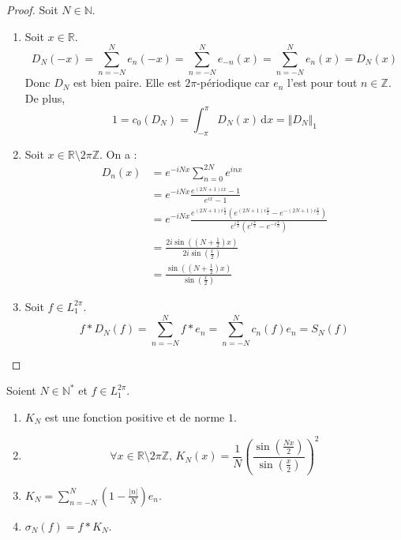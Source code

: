   \begin{proof}
    Soit $N \in \mathbb{N}$.
    \begin{enumerate}[label=(\roman*)]
      \item Soit $x \in \mathbb{R}$.
      \[ D_N(-x) = \sum_{n=-N}^{N} e_n(-x) = \sum_{n=-N}^{N} e_{-n}(x) = \sum_{n=-N}^{N} e_n(x) = D_N(x) \]
      Donc $D_N$ est bien paire. Elle est $2\pi$-périodique car $e_n$ l'est pour tout $n \in \mathbb{Z}$. De plus,
      \[ 1 = c_0(D_N) = \int_{-\pi}^{\pi} D_N(x) \, \mathrm{d}x = \Vert D_N \Vert_1 \]
      \item Soit $x \in \mathbb{R}\setminus 2\pi\mathbb{Z}$. On a :
      \begin{align*}
        D_n(x) &= e^{-iNx} \sum_{n=0}^{2N} e^{inx} \\
        &= e^{-iNx} \frac{e^{(2N+1)ix} - 1}{e^{ix} - 1} \\
        &= e^{-iNx} \frac{e^{(2N+1) i\frac{x}{2}} \left ( e^{(2N+1) i\frac{x}{2}} - e^{-(2N+1) i\frac{x}{2}} \right )}{e^{i\frac{x}{2}} \left( e^{i\frac{x}{2}} - e^{-i \frac{x}{2}} \right)} \\
        &= \frac{2i \sin \left( \left( N + \frac{1}{2} \right) x \right)}{2i \sin \left ( \frac{x}{2} \right)} \\
        &= \frac{\sin \left( \left( N + \frac{1}{2} \right) x \right)}{\sin \left ( \frac{x}{2} \right)}
      \end{align*}
      \item Soit $f \in L_1^{2 \pi}$.
      \[ f * D_N(f) = \sum_{n=-N}^N f * e_n = \sum_{n=-N}^N c_n(f) e_n = S_N(f) \]
    \end{enumerate}
  \end{proof}

  \begin{lemma}
    \label{theoreme-de-fejer-2}
    Soient $N \in \mathbb{N}^*$ et $f \in L_1^{2 \pi}$.
    \begin{enumerate}[label=(\roman*)]
      \item $K_N$ est une fonction positive et de norme $1$.
      \item \[ \forall x \in \mathbb{R} \setminus 2 \pi \mathbb{Z}, \, K_N(x) = \frac{1}{N} \left(\frac{\sin \left( \frac{Nx}{2} \right)}{\sin \left( \frac{x}{2} \right)}\right)^2 \]
      \item $K_N = \sum_{n=-N}^{N} \left(1 - \frac{\vert n \vert}{N}\right) e_n$.
      \item $\sigma_N(f) = f * K_N$.
    \end{enumerate}
  \end{lemma}


